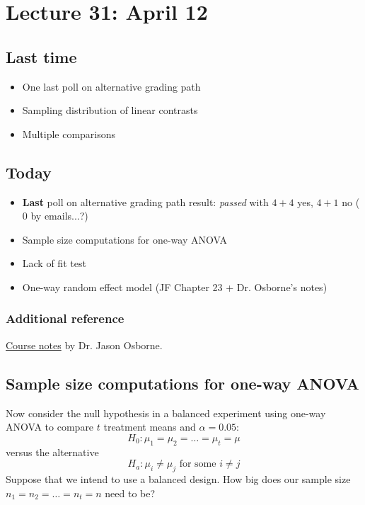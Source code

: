 \setcounter{section}{30}

\section{Lecture 31: April 12}


\subsection*{Last time}
\begin{itemize}
	\item One last poll on alternative grading path
	\item Sampling distribution of linear contrasts
	\item Multiple comparisons
\end{itemize}


\subsection*{Today}
\begin{itemize}
	\item {\bf Last} poll on alternative grading path result: {\it passed} with $4 + 4$ yes, $4 + 1$ no ($0$ by emails...?)
	\item Sample size computations for one-way ANOVA	
	\item Lack of fit test	
	\item One-way random effect model (JF Chapter 23 + Dr. Osborne's notes)
\end{itemize}

\subsubsection*{Additional reference}
\href{https://www4.stat.ncsu.edu/~osborne/st512r/handouts/allpackets.pdf}{Course notes} by Dr. Jason Osborne.

\subsection*{Sample size computations for one-way ANOVA}

Now consider the null hypothesis in a balanced experiment using one-way ANOVA to compare $t$ treatment means and $\alpha=0.05$:
$$
H_0: \mu_1 = \mu_2 = \dots = \mu_t = \mu
$$
versus the alternative
$$
H_a: \mu_i \ne \mu_j \mbox{ for some } i\ne j
$$
Suppose that we intend to use a balanced design.  How big does our sample size $n_1 = n_2 = \dots = n_t = n$ need to be?

